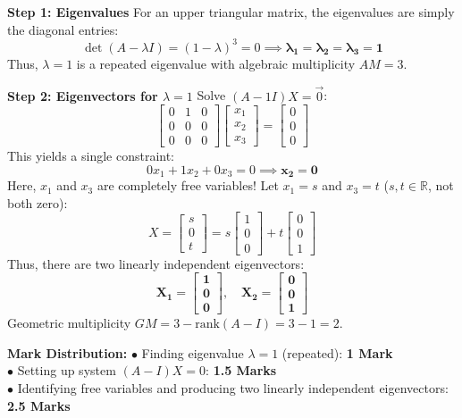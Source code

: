 \begin{solutionbox}
\textbf{Step 1: Eigenvalues}
For an upper triangular matrix, the eigenvalues are simply the diagonal entries:
\[
\det(A - \lambda I) = (1 - \lambda)^3 = 0 \implies \mathbf{\lambda_1 = \lambda_2 = \lambda_3 = 1}
\]
Thus, $\lambda = 1$ is a repeated eigenvalue with algebraic multiplicity $AM = 3$.

\textbf{Step 2: Eigenvectors for $\lambda = 1$}
Solve $(A - 1I)X = \vec{0}$:
\[
\begin{bmatrix} 0 & 1 & 0 \\ 0 & 0 & 0 \\ 0 & 0 & 0 \end{bmatrix} \begin{bmatrix} x_1 \\ x_2 \\ x_3 \end{bmatrix} = \begin{bmatrix} 0 \\ 0 \\ 0 \end{bmatrix}
\]
This yields a single constraint:
\[
0x_1 + 1x_2 + 0x_3 = 0 \implies \mathbf{x_2 = 0}
\]
Here, $x_1$ and $x_3$ are completely free variables!
Let $x_1 = s$ and $x_3 = t$ ($s, t \in \mathbb{R}$, not both zero):
\[
X = \begin{bmatrix} s \\ 0 \\ t \end{bmatrix} = s \begin{bmatrix} 1 \\ 0 \\ 0 \end{bmatrix} + t \begin{bmatrix} 0 \\ 0 \\ 1 \end{bmatrix}
\]
Thus, there are two linearly independent eigenvectors:
\[
\mathbf{X_1 = \begin{bmatrix} 1 \\ 0 \\ 0 \end{bmatrix}, \quad X_2 = \begin{bmatrix} 0 \\ 0 \\ 1 \end{bmatrix}}
\]
Geometric multiplicity $GM = 3 - \text{rank}(A-I) = 3 - 1 = 2$.

\begin{markingrubric}
\textbf{Mark Distribution:}
$\bullet$ Finding eigenvalue $\lambda = 1$ (repeated): \textbf{1 Mark}\\
$\bullet$ Setting up system $(A - I)X = 0$: \textbf{1.5 Marks}\\
$\bullet$ Identifying free variables and producing two linearly independent eigenvectors: \textbf{2.5 Marks}
\end{markingrubric}
\end{solutionbox}

